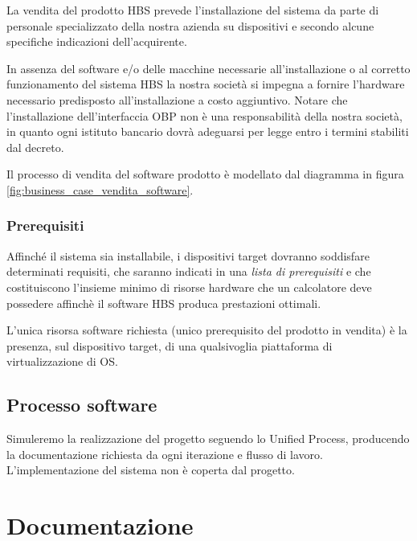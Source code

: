 \documentclass[10pt]{softeng} %
\begin{document}
La vendita del prodotto HBS prevede l'installazione del sistema da parte di personale specializzato della nostra azienda su dispositivi e secondo alcune specifiche indicazioni dell'acquirente.

In assenza del software e/o delle macchine necessarie all'installazione o al corretto funzionamento del sistema HBS la nostra societ\`a si impegna a fornire l’hardware necessario predisposto all’installazione a costo aggiuntivo.
Notare che l'installazione dell'interfaccia OBP non è una responsabilità della nostra società, in quanto ogni istituto bancario dovrà adeguarsi per legge entro i termini stabiliti dal decreto.

Il processo di vendita del software prodotto \`e modellato dal diagramma in figura \ref{fig:business_case_vendita_software}.

\subsubsection{Prerequisiti}

Affinch\'e il sistema sia installabile, i dispositivi target dovranno soddisfare determinati requisiti, che saranno indicati in una \emph{lista di prerequisiti} e che costituiscono l'insieme minimo di risorse hardware che un calcolatore deve possedere affinchè il software HBS produca prestazioni ottimali.

L'unica risorsa software richiesta (unico prerequisito del prodotto in vendita) è la presenza, sul dispositivo target, di una qualsivoglia piattaforma di virtualizzazione di OS.

\subsection{Processo software}

Simuleremo la realizzazione del progetto seguendo lo Unified Process, producendo la documentazione richiesta da ogni iterazione e flusso di lavoro.
L'implementazione del sistema non \`e coperta dal progetto.

\section{Documentazione}
\end{document}
